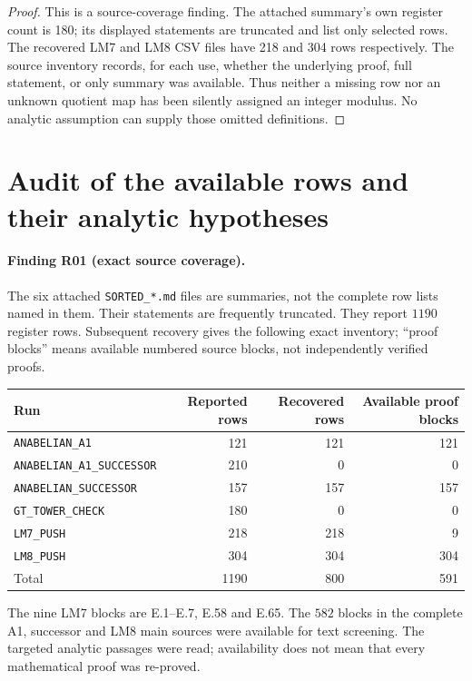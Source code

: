 \documentclass[11pt,a4paper]{article}
\begin{document}
\begin{proof}
This is a source-coverage finding. The attached summary's own register
count is 180; its displayed statements are truncated and list only
selected rows. The recovered LM7 and LM8 CSV files have 218 and 304
rows respectively. The source inventory records, for each use, whether
the underlying proof, full statement, or only summary was available.
Thus neither a missing row nor an unknown quotient map has been
silently assigned an integer modulus. No analytic assumption can
supply those omitted definitions.
\end{proof}


\section{Audit of the available rows and their analytic hypotheses}
\label{sec:row-audit}

\paragraph{Finding R01 (exact source coverage).}
The six attached \texttt{SORTED\_*.md} files are summaries, not the
complete row lists named in them. Their statements are frequently
truncated. They report $1190$ register rows. Subsequent recovery gives
the following exact inventory; ``proof blocks'' means available numbered
source blocks, not independently verified proofs.
\begin{center}
\begin{tabular}{lrrr}
\hline
Run & Reported rows & Recovered rows & Available proof blocks\\
\hline
\texttt{ANABELIAN\_A1} &121&121&121\\
\texttt{ANABELIAN\_A1\_SUCCESSOR}&210&0&0\\
\texttt{ANABELIAN\_SUCCESSOR}&157&157&157\\
\texttt{GT\_TOWER\_CHECK}&180&0&0\\
\texttt{LM7\_PUSH}&218&218&9\\
\texttt{LM8\_PUSH}&304&304&304\\
\hline
Total&1190&800&591\\
\hline
\end{tabular}
\end{center}
The nine LM7 blocks are E.1--E.7, E.58 and E.65. The $582$ blocks in
the complete A1, successor and LM8 main sources were available for
text screening. The targeted analytic passages were read; availability
does not mean that every mathematical proof was re-proved.
\end{document}
